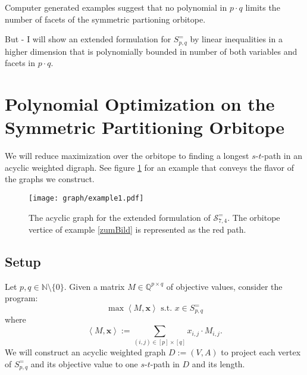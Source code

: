 \documentclass[a4paper]{amsart}
\theoremstyle{lemma}
\theoremstyle{definition}
\theoremstyle{remark}
\theoremstyle{example}
\newcommand{\lrX}[1]{\ensuremath{\left< #1 \right>}}
\newcommand{\calS}{\ensuremath{\mathcal{S}}}
\begin{document}
Computer generated examples suggest that no polynomial in \(p \cdot{}
q\) limits the number of facets of the symmetric partioning orbitope.

But - I will show an extended formulation for \(S^=_{p, q}\) by linear
inequalities in a higher dimension that is polynomially bounded in
number of both variables and facets in \(p \cdot q\).



\section{Polynomial Optimization on the  Symmetric Partitioning
  Orbitope}
\label{fluss}
We will reduce maximization over the orbitope to finding a longest
\(s\)-\(t\)-path in an acyclic weighted digraph.  See figure
\ref{example1graph} for an example that conveys the flavor of the
graphs we construct.

\begin{figure}
\texttt{[image: graph/example1.pdf]}
\caption{The acyclic graph for the extended formulation of
  \(\calS^=_{7, 4}\).  The orbitope vertice of example \ref{zumBild}
  is represented as the red path.}
\label{example1graph}
\end{figure}

\subsection{Setup}

Let \(p, q \in \mathbb{N} \setminus \{0\}\).  Given a matrix \(M \in
\mathbb{Q}^{p \times q}\) of objective values, consider the program:
\begin{equation}
\label{optS}
\max \lrX{M, \mathbf{x} }  \text{ s.t. } x \in S^=_{p, q}
\end{equation}
where \[\lrX{M, \mathbf{x} } := \sum_{(i, j)\in [p]\times [q]} x_{i, j}\cdot M_{i, j}\text{.}\]
We will construct an acyclic weighted graph \(D := (V, A)\) to project each vertex of
\(S^=_{p, q}\) and its objective value to one \(s\)-\(t\)-path in \(D\) and its length.
\end{document}
